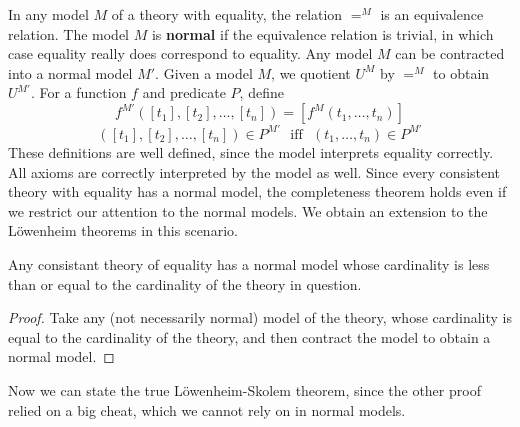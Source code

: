 In any model $M$ of a theory with equality, the relation $=^M$ is an equivalence relation. The model $M$ is {\bf normal} if the equivalence relation is trivial, in which case equality really does correspond to equality. Any model $M$ can be contracted into a normal model $M'$. Given a model $M$, we quotient $U^M$ by $=^M$ to obtain $U^{M'}$. For a function $f$ and predicate $P$, define
%
\[ f^{M'}([t_1],[t_2],\dots,[t_n]) = [f^M(t_1, \dots, t_n)] \]
%
\[ ([t_1],[t_2],\dots,[t_n]) \in P^{M'}\ \ \ \text{iff}\ \ \ (t_1, \dots, t_n) \in P^{M'} \]
%
These definitions are well defined, since the model interprets equality correctly. All axioms are correctly interpreted by the model as well. Since every consistent theory with equality has a normal model, the completeness theorem holds even if we restrict our attention to the normal models. We obtain an extension to the L\"{o}wenheim theorems in this scenario.

\begin{prop}
    Any consistant theory of equality has a normal model whose cardinality is less than or equal to the cardinality of the theory in question.
\end{prop}
\begin{proof}
    Take any (not necessarily normal) model of the theory, whose cardinality is equal to the cardinality of the theory, and then contract the model to obtain a normal model.
\end{proof}

Now we can state the true L\"{o}wenheim-Skolem theorem, since the other proof relied on a big cheat, which we cannot rely on in normal models.

